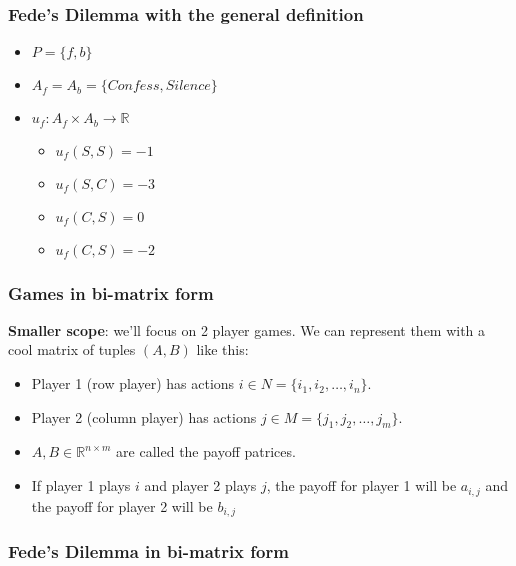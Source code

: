 \documentclass[pdf]{beamer}
\begin{document}
\begin{frame}
    \frametitle{Fede's Dilemma with the general definition}
    \begin{itemize}
        \item $P = \{f, b\}$
        \item \pause $A_f = A_b = \{Confess, Silence\}$
        \item \pause $u_f: A_f \times A_b \rightarrow \mathbb{R}$
        \begin{itemize}
            \item $u_f(S, S) = -1$
            \item $u_f(S, C) = -3$
            \item $u_f(C, S) = 0$
            \item $u_f(C, S) = -2$
        \end{itemize}
    \end{itemize}

\end{frame}

\begin{frame}
    \frametitle{Games in bi-matrix form}
        \textbf{Smaller scope}: we'll focus on 2 player games. We can represent them with a cool matrix of tuples $(A, B)$ like this:

        

        \begin{itemize}
            \item Player 1 (row player) has actions $i \in N = \{i_1, i_2, \dots, i_n\}$.
            \pause
            \item Player 2 (column player) has actions $j \in M = \{j_1, j_2, \dots, j_m\}$.
            \pause
            \item $A, B \in \mathbb{R}^{n \times m}$ are called the payoff patrices.
            \pause
            \item If player 1 plays $i$ and player 2 plays $j$, the payoff for player 1 will be $a_{i,j}$ and the payoff for player 2 will be $b_{i,j}$
        \end{itemize}
\end{frame}

\begin{frame}
    \frametitle{Fede's Dilemma in bi-matrix form}
    
\end{frame}
\end{document}
